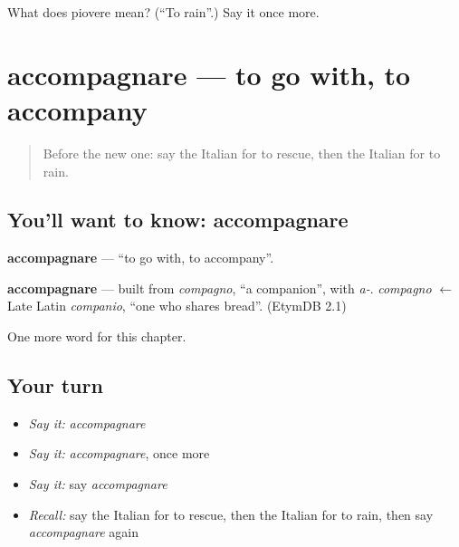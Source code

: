 \begin{tcolorbox}[breakable,colback=teal!4,colframe=teal!35!black,title={Before you move on}]
What does piovere mean? (\textquotedblleft{}To rain\textquotedblright{}.) Say it once more.
\end{tcolorbox}
\section[accompagnare]{accompagnare — to go with, to accompany}

\label{lesson:IT-C178-accompagnare}



\begin{quote}
Before the new one: say the Italian for to rescue, then the Italian for to rain.
\end{quote}

\subsection*{You'll want to know: accompagnare}
\textbf{accompagnare} — \textquotedblleft{}to go with, to accompany\textquotedblright{}.

\begin{cousinweb}
\textbf{accompagnare} — built from \emph{compagno}, \textquotedblleft{}a companion\textquotedblright{}, with \emph{a-}. \emph{compagno} $\leftarrow$ Late Latin \emph{companio}, \textquotedblleft{}one who shares bread\textquotedblright{}. (EtymDB 2.1)
\end{cousinweb}

\begin{grammarlens}[title={What you've built}]
One more word for this chapter.
\end{grammarlens}

\subsection*{Your turn}
\begin{itemize}
\raggedright
  \item \emph{Say it:} \emph{accompagnare}
  \item \emph{Say it:} \emph{accompagnare}, once more
  \item \emph{Say it:} say \emph{accompagnare}
  \item \emph{Recall:} say the Italian for to rescue, then the Italian for to rain, then say \emph{accompagnare} again
\end{itemize}

